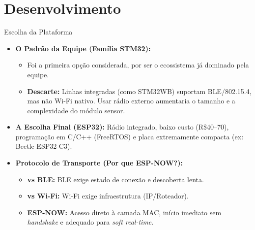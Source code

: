 \section{Desenvolvimento}

\begin{frame}{Escolha da Plataforma}
    \begin{itemize}
        \item \textbf{O Padrão da Equipe (Família STM32):} 
        \begin{itemize}
            \item Foi a primeira opção considerada, por ser o ecossistema já dominado pela equipe. 
            \item \textbf{Descarte:} Linhas integradas (como STM32WB) suportam BLE/802.15.4, mas não Wi-Fi nativo. Usar rádio externo aumentaria o tamanho e a complexidade do módulo sensor.
        \end{itemize}
        
        \item \textbf{A Escolha Final (ESP32):} Rádio integrado, baixo custo (R\$40--70), programação em C/C++ (FreeRTOS) e placa extremamente compacta (ex: Beetle ESP32-C3).
        
        \item \textbf{Protocolo de Transporte (Por que ESP-NOW?):} 
        \begin{itemize}
            \item \textbf{vs BLE:} BLE exige estado de conexão e descoberta lenta.
            \item \textbf{vs Wi-Fi:} Wi-Fi exige infraestrutura (IP/Roteador).
            \item \textbf{ESP-NOW:} Acesso direto à camada MAC, início imediato sem \textit{handshake} e adequado para \textit{soft real-time}.
        \end{itemize}
    \end{itemize}
\end{frame}

